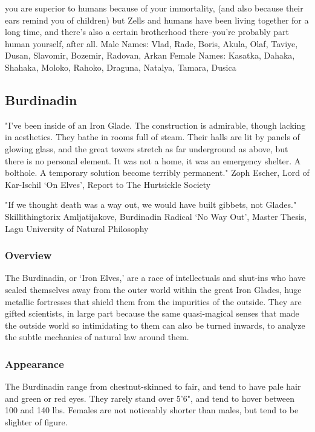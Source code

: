 \documentclass[oneside,11pt,english]{book}
\begin{document}
you are superior to humans because of your immortality, (and also because their ears remind you of 
children) but Zells and humans have been living together for a long time, and there’s also a certain 
brotherhood there--you’re probably part human yourself, after all. 
Male Names: Vlad, Rade, Boris, Akula, Olaf, Taviye, Dusan, Slavomir, Bozemir, Radovan, Arkan 
Female Names: Kasatka, Dahaka, Shahaka, Moloko, Rahoko, Draguna, Natalya, Tamara, Dusica 
 
\subsection{Burdinadin} 
"I've been inside of an Iron Glade. The construction is admirable, though lacking in aesthetics. They bathe in rooms full of steam. 
Their halls are lit by panels of glowing glass, and the great towers stretch as far underground as above, but there is no personal 
element. It was not a home, it was an emergency shelter. A bolthole. A temporary solution become terribly permanent." 
Zoph Escher, Lord of Kar-Ischil 
‘On Elves’, Report to The Hurtsickle Society 

 

"If we thought death was a way out, we would have built gibbets, not Glades." 
Skillithingtorix Amljatijakove, Burdinadin Radical 
‘No Way Out’, Master Thesis, Lagu University of Natural Philosophy 

 

\subsubsection*{Overview} 
The Burdinadin, or ‘Iron Elves,’ are a race of intellectuals and shut-ins who have sealed themselves away 
from the outer world within the great Iron Glades, huge metallic fortresses that shield them from the 
impurities of the outside. They are gifted scientists, in large part because the same quasi-magical senses 
that made the outside world so intimidating to them can also be turned inwards, to analyze the subtle 
mechanics of natural law around them. 

 

\subsubsection*{Appearance} 
The Burdinadin range from chestnut-skinned to fair, and tend to have pale hair and green or red eyes. 
They rarely stand over 5'6", and tend to hover between 100 and 140 lbs. Females are not noticeably 
shorter than males, but tend to be slighter of figure. 
\end{document}
